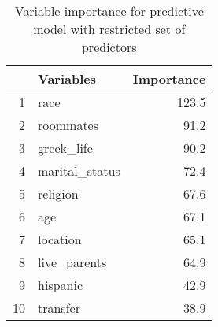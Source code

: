 \begin{table}[ht]
\centering
\begin{tabular}{rlr}
  \toprule
 & Variables & Importance \\ 
  \midrule
1 & race & 123.5 \\ 
  2 & roommates & 91.2 \\ 
  3 & greek\_life & 90.2 \\ 
  4 & marital\_status & 72.4 \\ 
  5 & religion & 67.6 \\ 
  6 & age & 67.1 \\ 
  7 & location & 65.1 \\ 
  8 & live\_parents & 64.9 \\ 
  9 & hispanic & 42.9 \\ 
  10 & transfer & 38.9 \\ 
   \bottomrule
\end{tabular}
\caption{Variable importance for predictive model with restricted set of predictors} 
\end{table}
